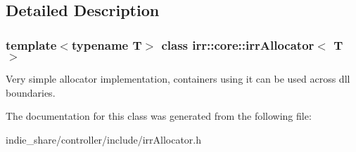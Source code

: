 \subsection{Detailed Description}
\subsubsection*{template$<$typename T$>$\newline
class irr\+::core\+::irr\+Allocator$<$ T $>$}

Very simple allocator implementation, containers using it can be used across dll boundaries. 

The documentation for this class was generated from the following file\+:\begin{DoxyCompactItemize}
\item 
indie\+\_\+share/controller/include/irr\+Allocator.\+h\end{DoxyCompactItemize}

